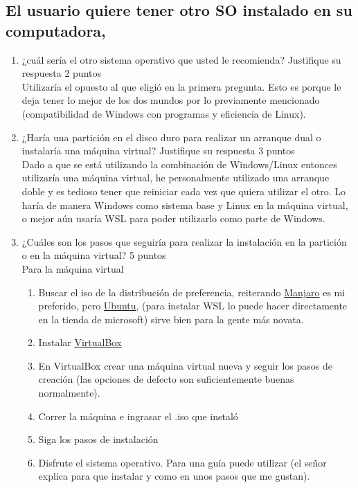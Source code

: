 \documentclass[stu, 12pt, letterpaper, donotrepeattitle, floatsintext, natbib, helv]{apa7}
\begin{document}
\subsection*{El usuario quiere tener otro SO instalado en su computadora,}
{}

\begin{enumerate}
    \item ¿cuál sería el otro sistema operativo que usted le recomienda? Justifique su respuesta 2 puntos \\
    \quad Utilizaría el opuesto al que eligió en la primera pregunta. Esto es porque le deja tener lo mejor de los dos mundos por lo previamente mencionado (compatibilidad de Windows con programas y eficiencia de Linux).
    \item ¿Haría una partición en el disco duro para realizar un arranque dual o instalaría una máquina virtual? Justifique su respuesta 3 puntos \\
    \quad Dado a que se está utilizando la combinación de Windows/Linux entonces utilizaría una máquina virtual, he personalmente utilizado una arranque doble y es tedioso tener que reiniciar cada vez que quiera utilizar el otro. Lo haría de manera Windows como sistema base y Linux en la máquina virtual, o mejor aún usaría WSL para poder utilizarlo como parte de Windows.
    \item ¿Cuáles son los pasos que seguiría para realizar la instalación en la partición o en la máquina virtual? 5 puntos \\
    Para la máquina virtual
    \begin{enumerate}
        \item Buscar el iso de la distribución de preferencia, reiterando \href{https://manjaro.org/download/}{Manjaro} es mi preferido, pero \href{https://ubuntu.com/download}{Ubuntu}, (para instalar WSL lo puede hacer directamente en la tienda de microsoft) sirve bien para la gente más novata.
        \item Instalar \href{https://www.virtualbox.org/wiki/Downloads}{VirtualBox}
        \item En VirtualBox crear una máquina virtual nueva y seguir los pasos de creación (las opciones de defecto son suficientemente buenas normalmente).
        \item Correr la máquina e ingrasar el .iso que instaló
        \item Siga los pasos de instalación
        \item Disfrute el sistema operativo. Para una guía puede utilizar \cite{NetworkChuck2021Jan} (el señor explica para que instalar y como en unos pasos que me gustan).
    \end{enumerate}
\end{enumerate}
\end{document}
